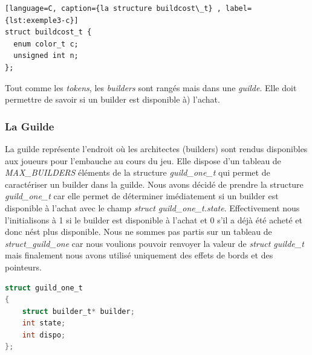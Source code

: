 \documentclass{article}
\begin{document}
    
\begin{tcolorbox}[colback=gray!10,colframe=white!75!black]

\begin{lstlisting}[language=C, caption={la structure buildcost\_t} , label={lst:exemple3-c}]
struct buildcost_t {
  enum color_t c;       
  unsigned int n;       
};
\end{lstlisting}
\end{tcolorbox}

\hspace{1em} Tout comme les \emph{tokens}, les \emph{builders} sont rangés mais dans une \emph{guilde}. Elle doit permettre de savoir si un builder est disponible à) l'achat. 

\subsubsection{La Guilde}
\vspace{1em}
\hspace{1em}
La guilde représente l'endroit où les architectes (builders) sont rendus disponibles aux joueurs pour l'embauche au cours du jeu. Elle dispose d'un tableau de \emph{MAX\_BUILDERS} éléments de la structure \emph{guild\_one\_t} qui permet de caractériser un builder dans la guilde. Nous avons décidé de prendre la structure \emph{guild\_one\_t} car elle permet de déterminer imédiatement si un builder est disponible à l'achat avec le champ \emph{struct guild\_one\_t.state}. Effectivement nous l'initialisons à 1 si le builder est disponible à l'achat et 0 s'il a déjà été acheté et donc n\'est plus disponible. Nous ne sommes pas partis sur un tableau de \emph{struct\_guild\_one} car nous voulions pouvoir renvoyer la valeur de \emph{struct guilde\_t} mais finalement nous avons utilisé uniquement des effets de bords et des pointeurs. 
\vspace{1em}

\begin{tcolorbox}[colback=gray!10,colframe=white!75!black]

\begin{lstlisting}[language=C, caption={La structure \texttt{guild\_one\_t}}, label={lst:exemple4-c}]
struct guild_one_t 
{
    struct builder_t* builder;
    int state;
    int dispo;
};
\end{lstlisting}
\end{tcolorbox}
\end{document}
